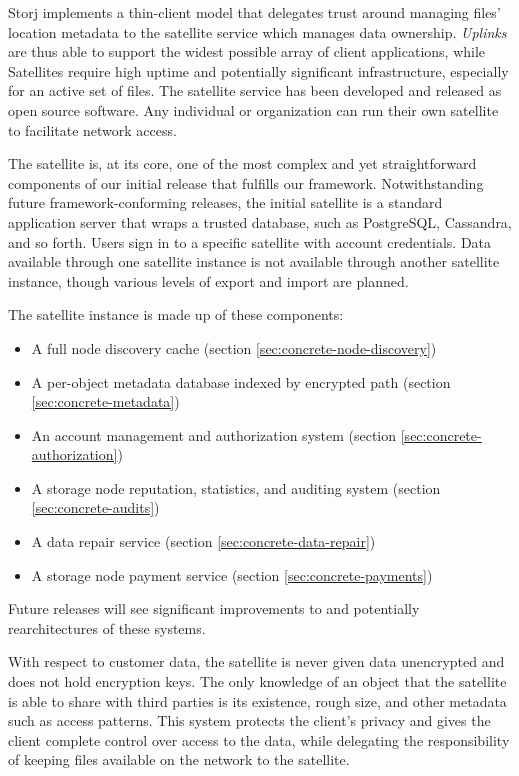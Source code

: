 \documentclass[11pt,fleqn,openany]{book}
\begin{document}
Storj implements a thin-client model that delegates trust around managing
files' location metadata to the satellite service which manages data
ownership. {\em Uplinks}
are thus able to support the widest possible array of client applications, while
Satellites require high uptime and potentially significant infrastructure,
especially for an active set of files.
The satellite service has been developed and released as open source software.
Any individual or organization can run their own satellite to facilitate
network access.

The satellite is, at its core, one of the most complex and yet
straightforward components of our initial release that fulfills our framework.
Notwithstanding future framework-conforming releases, the initial satellite
is a standard application server that wraps a trusted database, such as
PostgreSQL, Cassandra, and so forth. Users sign in to a specific
satellite with account credentials.
Data available through one satellite instance is
not available through another satellite instance, though various levels of
export and import are planned.

The satellite instance is made up of these components:
\begin{itemize}
\item A full node discovery cache (section \ref{sec:concrete-node-discovery})
\item A per-object metadata database indexed by encrypted path
  (section \ref{sec:concrete-metadata})
\item An account management and authorization system
  (section \ref{sec:concrete-authorization})
\item A storage node reputation, statistics, and auditing system
  (section \ref{sec:concrete-audits})
\item A data repair service (section \ref{sec:concrete-data-repair})
\item A storage node payment service (section \ref{sec:concrete-payments})
\end{itemize}

Future releases will see significant improvements to and potentially
rearchitectures of these systems.

With respect to customer data, the satellite is
never given data unencrypted and does not hold encryption keys.
The only knowledge of an object that the satellite is able to share with
third parties is its existence, rough size, and other metadata such as access
patterns.
This system protects the client's privacy and gives the client complete
control over access to the data,
while delegating the responsibility of keeping files available on the network
to the satellite.
\end{document}
